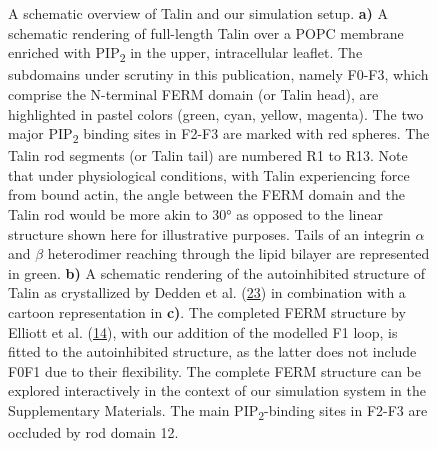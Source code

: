 \documentclass[
  twocolumn]{biophys-new-mod}
\begin{document}
\begin{figure}
\begin{minipage}[t]{0.50\linewidth}
{\centering 


}

\subcaption{\label{fig-tln-align-autoinhib}~}
\end{minipage}%

\caption{\label{fig-structure}A schematic overview of Talin and our
simulation setup. \textbf{a)} A schematic rendering of full-length Talin
over a POPC membrane enriched with PIP\textsubscript{2} in the upper,
intracellular leaflet. The subdomains under scrutiny in this
publication, namely F0-F3, which comprise the N-terminal FERM domain (or
Talin head), are highlighted in pastel colors (green, cyan, yellow,
magenta). The two major PIP\textsubscript{2} binding sites in F2-F3 are
marked with red spheres. The Talin rod segments (or Talin tail) are
numbered R1 to R13. Note that under physiological conditions, with Talin
experiencing force from bound actin, the angle between the FERM domain
and the Talin rod would be more akin to 30° as opposed to the linear
structure shown here for illustrative purposes. Tails of an integrin
\(\alpha\) and \(\beta\) heterodimer reaching through the lipid bilayer
are represented in green. \textbf{b)} A schematic rendering of the
autoinhibited structure of Talin as crystallized by Dedden et al.
(\protect\hyperlink{ref-deddenArchitectureTalin1Reveals2019a}{23}) in
combination with a cartoon representation in \textbf{c)}. The completed
FERM structure by Elliott et al.
(\protect\hyperlink{ref-elliottStructureTalinHead2010}{14}), with our
addition of the modelled F1 loop, is fitted to the autoinhibited
structure, as the latter does not include F0F1 due to their flexibility.
The complete FERM structure can be explored interactively in the context
of our simulation system in the Supplementary Materials. The main
PIP\textsubscript{2}-binding sites in F2-F3 are occluded by rod domain
12.}

\end{figure}
\end{document}

